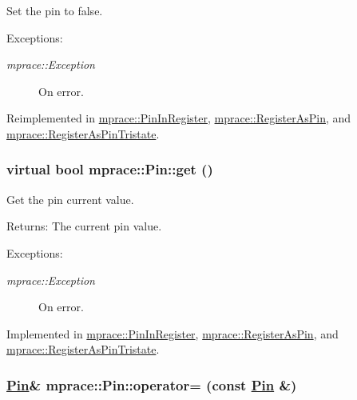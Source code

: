 Set the pin to false. 

\begin{Desc}
\item[Exceptions:]
\begin{description}
\item[{\em mprace::Exception}]On error.\end{description}
\end{Desc}


Reimplemented in \hyperlink{classmprace_1_1PinInRegister_a5}{mprace::Pin\-In\-Register}, \hyperlink{classmprace_1_1RegisterAsPin_a5}{mprace::Register\-As\-Pin}, and \hyperlink{classmprace_1_1RegisterAsPinTristate_a6}{mprace::Register\-As\-Pin\-Tristate}.\hypertarget{classmprace_1_1Pin_a2}{
\subsubsection[get]{\setlength{\rightskip}{0pt plus 5cm}virtual bool mprace::Pin::get ()}}
\label{classmprace_1_1Pin_a2}


Get the pin current value. 

\begin{Desc}
\item[Returns:]The current pin value. \end{Desc}
\begin{Desc}
\item[Exceptions:]
\begin{description}
\item[{\em mprace::Exception}]On error.\end{description}
\end{Desc}


Implemented in \hyperlink{classmprace_1_1PinInRegister_a3}{mprace::Pin\-In\-Register}, \hyperlink{classmprace_1_1RegisterAsPin_a3}{mprace::Register\-As\-Pin}, and \hyperlink{classmprace_1_1RegisterAsPinTristate_a4}{mprace::Register\-As\-Pin\-Tristate}.\hypertarget{classmprace_1_1Pin_b2}{
\subsubsection[operator=]{\setlength{\rightskip}{0pt plus 5cm}\hyperlink{classmprace_1_1Pin}{Pin}\& mprace::Pin::operator= (const \hyperlink{classmprace_1_1Pin}{Pin} \&)}}
\label{classmprace_1_1Pin_b2}


